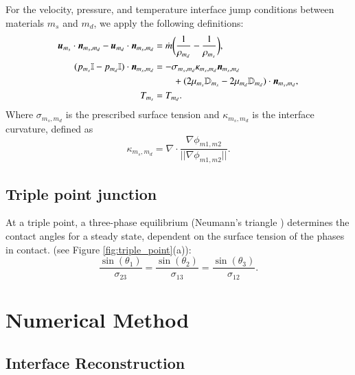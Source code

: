 \documentclass[preprint,12pt]{Definitions/elsarticle}
\newcommand{\bmu}{\mbox{\boldmath $u$\unboldmath}}
\newcommand{\bmn}{\mbox{\boldmath $n$\unboldmath}}
\newcommand{\DefTen}{\mathbb{D}}
\newcommand{\EyeTen}{\mathbb{I}}
\begin{document}
\noindent For the velocity, pressure, 
and temperature interface jump conditions between materials $m_{s}$ and $m_{d}$, we apply the following definitions:
\begin{align}
\bmu_{m_{s}}\cdot \bmn_{m_{s},m_{d}}-
\bmu_{m_{d}}\cdot \bmn_{m_{s},m_{d}} &= 
\dot{m}\bigg(\frac{1}{\rho_{m_{d}}}-
\frac{1}{\rho_{m_{s}}}\bigg),\\
(p_{m_{s}}\EyeTen-
p_{m_{d}}\EyeTen)\cdot\bmn_{m_{s},m_{d}} &=
-\sigma_{m_{s},m_{d}}\kappa_{m_{s},m_{d}}\bmn_{m_{s},m_{d}} \\
&\qquad + (2\mu_{m_{s}}\DefTen_{m_{s}}-
2\mu_{m_{d}}\DefTen_{m_{d}})\cdot\bmn_{m_{s},m_{d}},\nonumber\\
T_{m_{s}} &= T_{m_{d}}.
\label{vtp_jump}
\end{align}
Where $\sigma_{m_{s},m_{d}}$ is the prescribed surface tension and $\kappa_{m_{s},m_{d}}$ is the interface curvature, defined as
\begin{equation}
\kappa_{m_{s},m_{d}}=\nabla\cdot
\frac{\nabla\phi_{m1,m2}}
{||\nabla\phi_{m1,m2}||}.
\end{equation}

\subsection{Triple point junction}
\noindent At a triple point, a three-phase equilibrium (Neumann's triangle \cite{de2013capillarity}) determines the contact angles for a steady state, dependent on the surface tension of the phases in contact. (see Figure \ref{fig:triple_point}(a)):
\begin{equation}
\label{eq:triple_point_eqlib}
\frac{\sin(\theta_{1})}{\sigma_{23}}=
\frac{\sin(\theta_{2})}{\sigma_{13}}=
\frac{\sin(\theta_{3})}{\sigma_{12}}.
\end{equation}
\newline


\FloatBarrier
\section{Numerical Method}
\FloatBarrier
\subsection{Interface Reconstruction}
\FloatBarrier
\end{document}

